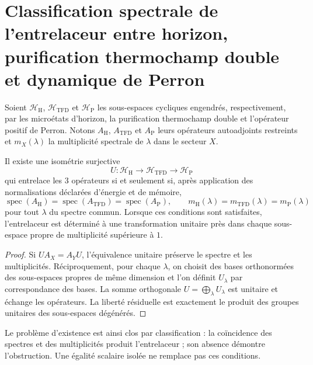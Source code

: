 
\section{Classification spectrale de l'entrelaceur entre horizon, purification thermochamp double et dynamique de Perron}
\label{sec:ivv-horizon-tfd-perron-classification}

Soient \(\mathcal H_{\mathrm H}\), \(\mathcal H_{\mathrm{TFD}}\) et
\(\mathcal H_{\mathrm P}\) les sous-espaces cycliques engendrés,
respectivement, par les microétats d'horizon, la purification
thermochamp double et l'opérateur positif de Perron. Notons
\(A_{\mathrm H}\), \(A_{\mathrm{TFD}}\) et \(A_{\mathrm P}\) leurs opérateurs
autoadjoints restreints et \(m_X(\lambda)\) la multiplicité spectrale
de \(\lambda\) dans le secteur \(X\).

\begin{theorem}
\label{thm:ivv-horizon-tfd-perron-classification}
Il existe une isométrie surjective
\[
 U:\mathcal H_{\mathrm H}\longrightarrow\mathcal H_{\mathrm{TFD}}
 \longrightarrow\mathcal H_{\mathrm P}
\]
qui entrelace les \(3\) opérateurs si et seulement si, après application des
normalisations déclarées d'énergie et de mémoire,
\[
 \operatorname{spec}(A_{\mathrm H})
 =\operatorname{spec}(A_{\mathrm{TFD}})
 =\operatorname{spec}(A_{\mathrm P}),
 \qquad
 m_{\mathrm H}(\lambda)=m_{\mathrm{TFD}}(\lambda)=m_{\mathrm P}(\lambda)
\]
pour tout \(\lambda\) du spectre commun. Lorsque ces conditions sont
satisfaites, l'entrelaceur est déterminé à une transformation unitaire près
dans chaque sous-espace propre de multiplicité supérieure à \(1\).
\end{theorem}

\begin{proof}
Si \(U A_X=A_YU\), l'équivalence unitaire préserve le spectre et les
multiplicités. Réciproquement, pour chaque \(\lambda\), on choisit des bases
orthonormées des sous-espaces propres de même dimension et l'on définit
\(U_\lambda\) par correspondance des bases. La somme orthogonale
\(U=\bigoplus_\lambda U_\lambda\) est unitaire et échange les opérateurs.
La liberté résiduelle est exactement le produit des groupes unitaires des
sous-espaces dégénérés.
\end{proof}

Le problème d'existence est ainsi clos par classification : la coïncidence
des spectres et des multiplicités produit l'entrelaceur ; son absence
démontre l'obstruction. Une égalité scalaire isolée ne remplace pas ces
conditions.

